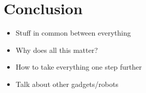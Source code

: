 \newpage
\section{Conclusion}
\begin{itemize}
  \item Stuff in common between everything
  \item Why does all this matter?
  \item How to take everything one step further
  \item Talk about other gadgets/robots
\end{itemize}
